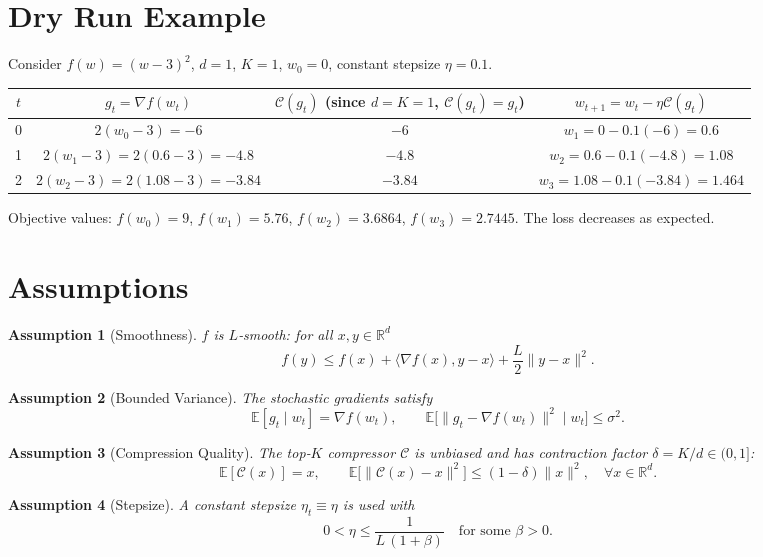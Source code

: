 \documentclass{article}
\newtheorem{assumption}{Assumption}
\newcommand{\E}{\mathbb{E}}
\newcommand{\R}{\mathbb{R}}
\newcommand{\C}{\mathcal{C}}
\begin{document}
\section*{Dry Run Example}
Consider $f(w)=(w-3)^{2}$, $d=1$, $K=1$, $w_{0}=0$, constant stepsize $\eta=0.1$.
\begin{center}
\begin{tabular}{c|c|c|c}
$t$ & $g_t=\nabla f(w_t)$ & $\C(g_t)$ (since $d=K=1$, $\C(g_t)=g_t$) & $w_{t+1}=w_t-\eta\C(g_t)$\\\hline
0 & $2(w_0-3)=-6$ & $-6$ & $w_1=0-0.1(-6)=0.6$\\
1 & $2(w_1-3)=2(0.6-3)=-4.8$ & $-4.8$ & $w_2=0.6-0.1(-4.8)=1.08$\\
2 & $2(w_2-3)=2(1.08-3)=-3.84$ & $-3.84$ & $w_3=1.08-0.1(-3.84)=1.464$\\
\end{tabular}
\end{center}
Objective values: $f(w_0)=9$, $f(w_1)=5.76$, $f(w_2)=3.6864$, $f(w_3)=2.7445$.  The loss decreases as expected.

\newpage

\section*{Assumptions}
\begin{assumption}[Smoothness]\label{ass:smooth}
$f$ is $L$‑smooth: for all $x,y\in\R^{d}$
\[
f(y)\le f(x)+\langle\nabla f(x),y-x\rangle+\frac{L}{2}\|y-x\|^{2}.
\]
\end{assumption}
\begin{assumption}[Bounded Variance]\label{ass:variance}
The stochastic gradients satisfy
\[
\E[g_t\mid w_t]=\nabla f(w_t),\qquad 
\E\bigl[\|g_t-\nabla f(w_t)\|^{2}\mid w_t\bigr]\le\sigma^{2}.
\]
\end{assumption}
\begin{assumption}[Compression Quality]\label{ass:compress}
The top‑$K$ compressor $\C$ is unbiased and has contraction factor $\delta=K/d\in(0,1]$:
\[
\E[\C(x)]=x,\qquad 
\E\bigl[\|\C(x)-x\|^{2}\bigr]\le(1-\delta)\|x\|^{2},\quad\forall x\in\R^{d}.
\]
\end{assumption}
\begin{assumption}[Stepsize]\label{ass:stepsize}
A constant stepsize $\eta_t\equiv\eta$ is used with
\[
0<\eta\le\frac{1}{L\,(1+\beta)}\quad\text{for some }\beta>0.
\]
\end{assumption}
\end{document}
